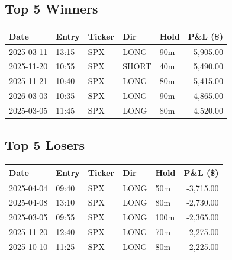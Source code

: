 \documentclass[11pt,a4paper,twoside]{article}
\begin{document}
\subsection{Top 5 Winners}
\noindent\begin{center}
\begin{tabular}{>{\color{txtmain}}l llll r}
\toprule
\rowcolor{cardbg}
\textbf{Date} & \textbf{Entry} & \textbf{Ticker} & \textbf{Dir} & \textbf{Hold} & \textbf{P\&L (\$)} \\
\midrule
2025-03-11 & 13:15 & SPX & LONG & 90m & \textcolor{wingreen}{5,905.00} \\
2025-11-20 & 10:55 & SPX & SHORT & 40m & \textcolor{wingreen}{5,490.00} \\
2025-11-21 & 10:40 & SPX & LONG & 80m & \textcolor{wingreen}{5,415.00} \\
2026-03-03 & 10:35 & SPX & LONG & 90m & \textcolor{wingreen}{4,865.00} \\
2025-03-05 & 11:45 & SPX & LONG & 80m & \textcolor{wingreen}{4,520.00} \\
\bottomrule
\end{tabular}
\end{center}
\subsection{Top 5 Losers}
\noindent\begin{center}
\begin{tabular}{>{\color{txtmain}}l llll r}
\toprule
\rowcolor{cardbg}
\textbf{Date} & \textbf{Entry} & \textbf{Ticker} & \textbf{Dir} & \textbf{Hold} & \textbf{P\&L (\$)} \\
\midrule
2025-04-04 & 09:40 & SPX & LONG & 50m & \textcolor{lossred}{-3,715.00} \\
2025-04-08 & 13:10 & SPX & LONG & 80m & \textcolor{lossred}{-2,730.00} \\
2025-03-05 & 09:55 & SPX & LONG & 100m & \textcolor{lossred}{-2,365.00} \\
2025-11-20 & 12:40 & SPX & LONG & 70m & \textcolor{lossred}{-2,275.00} \\
2025-10-10 & 11:25 & SPX & LONG & 80m & \textcolor{lossred}{-2,225.00} \\
\bottomrule
\end{tabular}
\end{center}
\clearpage
\end{document}
